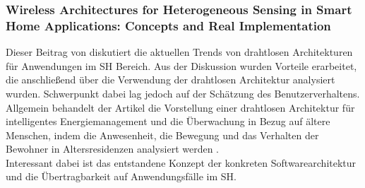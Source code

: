         \subsubsection*{Wireless Architectures for Heterogeneous Sensing in Smart Home Applications: Concepts and Real Implementation}
            Dieser Beitrag von \cite{Viani2013} diskutiert die aktuellen Trends von drahtlosen Architekturen für Anwendungen 
            im \acl{SH} Bereich. Aus der Diskussion wurden Vorteile erarbeitet, die anschließend über die Verwendung der 
            drahtlosen Architektur analysiert wurden. Schwerpunkt dabei lag jedoch auf der Schätzung des Benutzerverhaltens. 
            \\
            \linebreak
            Allgemein behandelt der Artikel die Vorstellung einer drahtlosen Architektur für intelligentes Energiemanagement 
            und die Überwachung in Bezug auf ältere Menschen, indem die Anwesenheit, die Bewegung und das Verhalten der Bewohner in Altersresidenzen 
            analysiert werden \cite{Viani2013}. 
            \\
            Interessant dabei ist das entstandene Konzept der konkreten Softwarearchitektur und die Übertragbarkeit auf Anwendungsfälle im \acl{SH}.

